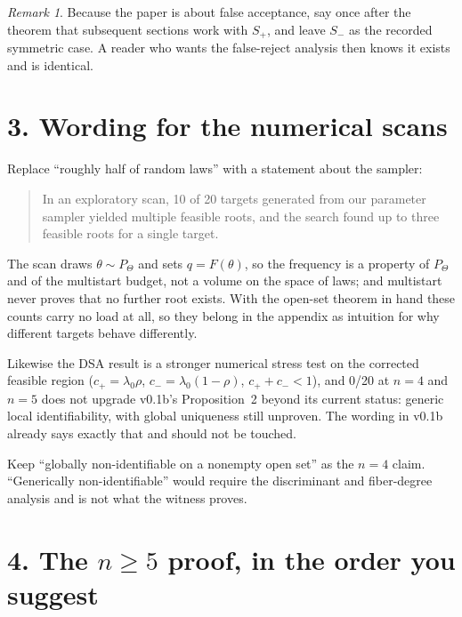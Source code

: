 \documentclass[11pt]{article}
\theoremstyle{remark}
\newtheorem*{remark}{Remark}
\begin{document}
\begin{remark}
Because the paper is about false acceptance, say once after the theorem that subsequent sections work with $S_+$, and leave $S_-$ as the recorded symmetric case. A reader who wants the false-reject analysis then knows it exists and is identical.
\end{remark}

\section*{3. Wording for the numerical scans}

Replace ``roughly half of random laws'' with a statement about the sampler:

\begin{quote}
In an exploratory scan, 10 of 20 targets generated from our parameter sampler yielded multiple feasible roots, and the search found up to three feasible roots for a single target.
\end{quote}

The scan draws $\theta\sim P_\Theta$ and sets $q=F(\theta)$, so the frequency is a property of $P_\Theta$ and of the multistart budget, not a volume on the space of laws; and multistart never proves that no further root exists. With the open-set theorem in hand these counts carry no load at all, so they belong in the appendix as intuition for why different targets behave differently.

Likewise the DSA result is a stronger numerical stress test on the corrected feasible region ($c_+=\lambda_0\rho$, $c_-=\lambda_0(1-\rho)$, $c_++c_-<1$), and 0/20 at $n=4$ and $n=5$ does not upgrade v0.1b's Proposition~2 beyond its current status: generic local identifiability, with global uniqueness still unproven. The wording in v0.1b already says exactly that and should not be touched.

Keep ``globally non-identifiable on a nonempty open set'' as the $n=4$ claim. ``Generically non-identifiable'' would require the discriminant and fiber-degree analysis and is not what the witness proves.

\section*{4. The $n\ge5$ proof, in the order you suggest}
\end{document}
